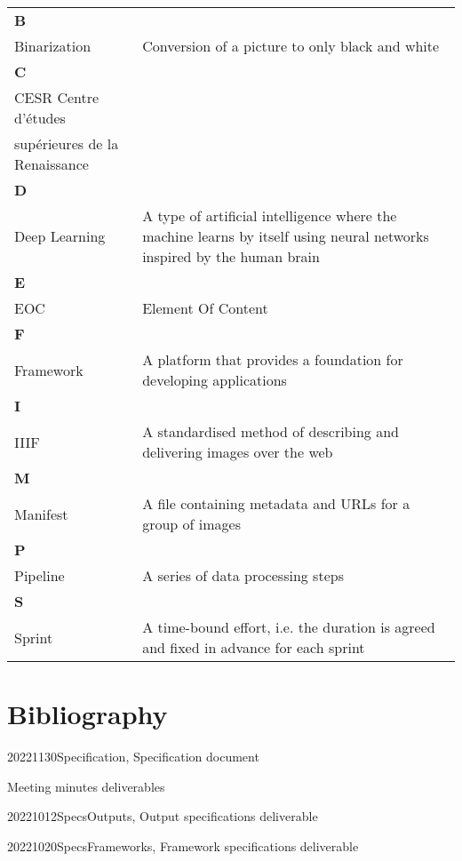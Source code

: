 \documentclass{polytech/polytech}
\numberwithin{figure}{chapter}
\begin{document}
\begin{appendix}
\begin{table}[]
\begin{tabular}{ll}
\textbf{B}	& \\
Binarization	& Conversion of a picture to only black and white\\
	
\textbf{C}	& \\
CESR	Centre d’études \\supérieures de la Renaissance\\
	
\textbf{D}	& \\
Deep Learning	& A type of artificial intelligence where the machine learns by itself using neural networks inspired by the human brain\\
	
\textbf{E}	& \\
EOC	& Element Of Content\\
	
\textbf{F}	& \\
Framework	& A platform that provides a foundation for developing applications\\
	
\textbf{I}	& \\
IIIF	& A standardised method of describing and delivering images over the web\\
	
\textbf{M}	& \\
Manifest	& A file containing metadata and URLs for a group of images\\
	
\textbf{P}	& \\
Pipeline	& A series of data processing steps\\
	
\textbf{S}	& \\
Sprint	& A time-bound effort, i.e. the duration is agreed and fixed in advance for each sprint\\
\end{tabular}
\end{table}



\chapter{Bibliography}

20221130Specification, Specification document

Meeting minutes deliverables

20221012SpecsOutputs, Output specifications deliverable

20221020SpecsFrameworks, Framework specifications deliverable


\end{appendix}
\end{document}
